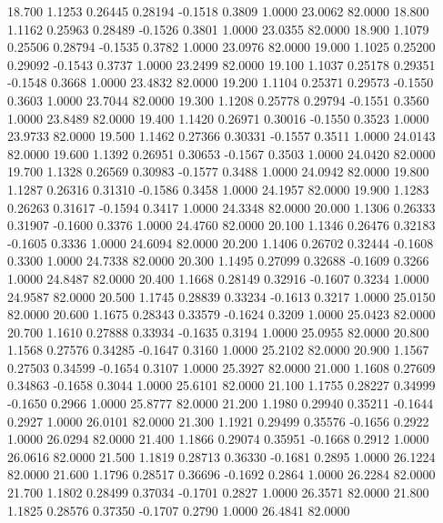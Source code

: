   18.700   1.1253   0.26445   0.28194  -0.1518   0.3809   1.0000  23.0062  82.0000
  18.800   1.1162   0.25963   0.28489  -0.1526   0.3801   1.0000  23.0355  82.0000
  18.900   1.1079   0.25506   0.28794  -0.1535   0.3782   1.0000  23.0976  82.0000
  19.000   1.1025   0.25200   0.29092  -0.1543   0.3737   1.0000  23.2499  82.0000
  19.100   1.1037   0.25178   0.29351  -0.1548   0.3668   1.0000  23.4832  82.0000
  19.200   1.1104   0.25371   0.29573  -0.1550   0.3603   1.0000  23.7044  82.0000
  19.300   1.1208   0.25778   0.29794  -0.1551   0.3560   1.0000  23.8489  82.0000
  19.400   1.1420   0.26971   0.30016  -0.1550   0.3523   1.0000  23.9733  82.0000
  19.500   1.1462   0.27366   0.30331  -0.1557   0.3511   1.0000  24.0143  82.0000
  19.600   1.1392   0.26951   0.30653  -0.1567   0.3503   1.0000  24.0420  82.0000
  19.700   1.1328   0.26569   0.30983  -0.1577   0.3488   1.0000  24.0942  82.0000
  19.800   1.1287   0.26316   0.31310  -0.1586   0.3458   1.0000  24.1957  82.0000
  19.900   1.1283   0.26263   0.31617  -0.1594   0.3417   1.0000  24.3348  82.0000
  20.000   1.1306   0.26333   0.31907  -0.1600   0.3376   1.0000  24.4760  82.0000
  20.100   1.1346   0.26476   0.32183  -0.1605   0.3336   1.0000  24.6094  82.0000
  20.200   1.1406   0.26702   0.32444  -0.1608   0.3300   1.0000  24.7338  82.0000
  20.300   1.1495   0.27099   0.32688  -0.1609   0.3266   1.0000  24.8487  82.0000
  20.400   1.1668   0.28149   0.32916  -0.1607   0.3234   1.0000  24.9587  82.0000
  20.500   1.1745   0.28839   0.33234  -0.1613   0.3217   1.0000  25.0150  82.0000
  20.600   1.1675   0.28343   0.33579  -0.1624   0.3209   1.0000  25.0423  82.0000
  20.700   1.1610   0.27888   0.33934  -0.1635   0.3194   1.0000  25.0955  82.0000
  20.800   1.1568   0.27576   0.34285  -0.1647   0.3160   1.0000  25.2102  82.0000
  20.900   1.1567   0.27503   0.34599  -0.1654   0.3107   1.0000  25.3927  82.0000
  21.000   1.1608   0.27609   0.34863  -0.1658   0.3044   1.0000  25.6101  82.0000
  21.100   1.1755   0.28227   0.34999  -0.1650   0.2966   1.0000  25.8777  82.0000
  21.200   1.1980   0.29940   0.35211  -0.1644   0.2927   1.0000  26.0101  82.0000
  21.300   1.1921   0.29499   0.35576  -0.1656   0.2922   1.0000  26.0294  82.0000
  21.400   1.1866   0.29074   0.35951  -0.1668   0.2912   1.0000  26.0616  82.0000
  21.500   1.1819   0.28713   0.36330  -0.1681   0.2895   1.0000  26.1224  82.0000
  21.600   1.1796   0.28517   0.36696  -0.1692   0.2864   1.0000  26.2284  82.0000
  21.700   1.1802   0.28499   0.37034  -0.1701   0.2827   1.0000  26.3571  82.0000
  21.800   1.1825   0.28576   0.37350  -0.1707   0.2790   1.0000  26.4841  82.0000
